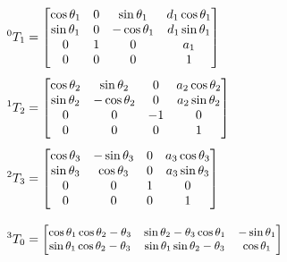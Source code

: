 \begin{align}
    ^0T_1 & =
    \begin{bmatrix}
        \cos{\theta_{1}} & 0 & \sin{\theta_{1}}   & d_{1} \cos{\theta_{1}} \\
        \sin{\theta_{1}} & 0 & - \cos{\theta_{1}} & d_{1} \sin{\theta_{1}} \\
        0                & 1 & 0                  & a_{1}                  \\
        0                & 0 & 0                  & 1                      \\
    \end{bmatrix}\label{eq:t01} \\[1ex]
    ^1T_2 & =
    \begin{bmatrix}
        \cos{\theta_{2}} & \sin{\theta_{2}}   & 0  & a_{2} \cos{\theta_{2}} \\
        \sin{\theta_{2}} & - \cos{\theta_{2}} & 0  & a_{2} \sin{\theta_{2}} \\
        0                & 0                  & -1 & 0                      \\
        0                & 0                  & 0  & 1                      \\
    \end{bmatrix}\label{eq:t12} \\[1ex]
    ^2T_3 & =
    \begin{bmatrix}
        \cos{\theta_{3}} & - \sin{\theta_{3}} & 0 & a_{3} \cos{\theta_{3}} \\
        \sin{\theta_{3}} & \cos{\theta_{3}}   & 0 & a_{3} \sin{\theta_{3}} \\
        0                & 0                  & 1 & 0                      \\
        0                & 0                  & 0 & 1                      \\
    \end{bmatrix}\label{eq:t23} \\[2ex]
    ^3T_0 & =
    {\small\begin{bmatrix}
        \cos{\theta_{1}} \cos{\theta_{2} - \theta_{3}} & \sin{\theta_{2} - \theta_{3}} \cos{\theta_{1}}                                                                    & - \sin{\theta_{1}} \\
        \sin{\theta_{1}} \cos{\theta_{2} - \theta_{3}} & \sin{\theta_{1}} \sin{\theta_{2} - \theta_{3}}                                                                    & \cos{\theta_{1}}   \\

\end{bmatrix}}
\end{align}
